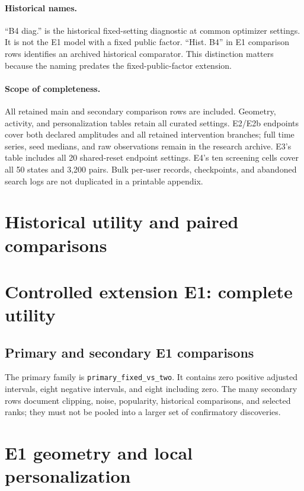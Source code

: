 \documentclass[10pt,a4paper]{article}
\begin{document}
\paragraph{Historical names.} ``B4 diag.'' is the historical fixed-setting
diagnostic at common optimizer settings. It is not the E1 model with a fixed
public factor. ``Hist. B4'' in E1 comparison rows identifies an archived
historical comparator. This distinction matters because the naming predates
the fixed-public-factor extension.

\paragraph{Scope of completeness.} All retained main and secondary comparison
rows are included. Geometry, activity, and personalization tables retain
all curated settings. E2/E2b endpoints cover both declared amplitudes and
all retained intervention branches; full time series, seed medians, and
raw observations remain in the research archive. E3's table includes all
20 shared-reset endpoint settings. E4's ten screening cells cover all
50 states and 3,200 pairs. Bulk per-user records, checkpoints, and abandoned
search logs are not duplicated in a printable appendix.

\section{Historical utility and paired comparisons}



\FloatBarrier

\clearpage

\clearpage
\section{Controlled extension E1: complete utility}

\clearpage
\subsection{Primary and secondary E1 comparisons}
The primary family is \texttt{primary\_fixed\_vs\_two}. It contains zero
positive adjusted intervals, eight negative intervals, and eight including
zero. The many secondary rows document clipping, noise, popularity,
historical comparisons, and selected ranks; they must not be pooled into
a larger set of confirmatory discoveries.

\clearpage
\section{E1 geometry and local personalization}
\end{document}
